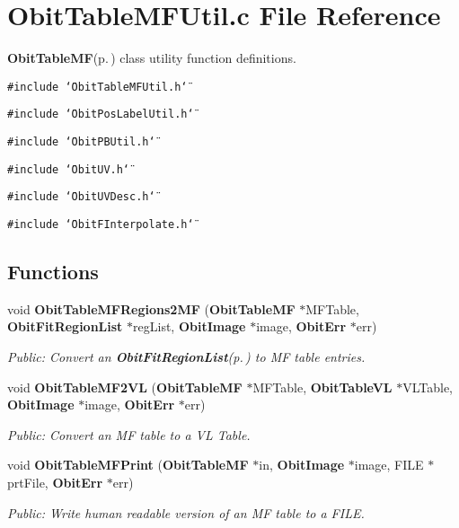 \section{Obit\-Table\-MFUtil.c File Reference}
\label{ObitTableMFUtil_8c}
{\bf Obit\-Table\-MF}{\rm (p.\,\pageref{structObitTableMF})} class utility function definitions. 

{\tt \#include \char`\"{}Obit\-Table\-MFUtil.h\char`\"{}}\par
{\tt \#include \char`\"{}Obit\-Pos\-Label\-Util.h\char`\"{}}\par
{\tt \#include \char`\"{}Obit\-PBUtil.h\char`\"{}}\par
{\tt \#include \char`\"{}Obit\-UV.h\char`\"{}}\par
{\tt \#include \char`\"{}Obit\-UVDesc.h\char`\"{}}\par
{\tt \#include \char`\"{}Obit\-FInterpolate.h\char`\"{}}\par
\subsection*{Functions}
\begin{CompactItemize}
\item 
void {\bf Obit\-Table\-MFRegions2MF} ({\bf Obit\-Table\-MF} $\ast$MFTable, {\bf Obit\-Fit\-Region\-List} $\ast$reg\-List, {\bf Obit\-Image} $\ast$image, {\bf Obit\-Err} $\ast$err)
\begin{CompactList}\small\item\em Public: Convert an {\bf Obit\-Fit\-Region\-List}{\rm (p.\,\pageref{structObitFitRegionList})} to MF table entries. \item\end{CompactList}\item 
void {\bf Obit\-Table\-MF2VL} ({\bf Obit\-Table\-MF} $\ast$MFTable, {\bf Obit\-Table\-VL} $\ast$VLTable, {\bf Obit\-Image} $\ast$image, {\bf Obit\-Err} $\ast$err)
\begin{CompactList}\small\item\em Public: Convert an MF table to a VL Table. \item\end{CompactList}\item 
void {\bf Obit\-Table\-MFPrint} ({\bf Obit\-Table\-MF} $\ast$in, {\bf Obit\-Image} $\ast$image, FILE $\ast$prt\-File, {\bf Obit\-Err} $\ast$err)
\begin{CompactList}\small\item\em Public: Write human readable version of an MF table to a FILE. \item\end{CompactList}\end{CompactItemize}


